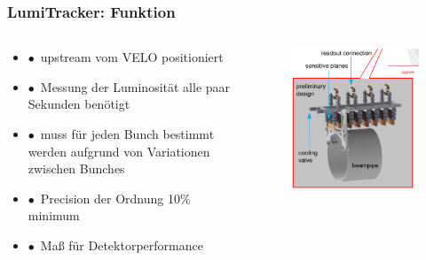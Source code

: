 \documentclass[aspectratio=1610, 12pt, xcolor=dvipsnames]{beamer}
\begin{document}
\begin{frame}\frametitle{LumiTracker: Funktion}
  \begin{columns}
    \begin{column}[c]{0.48\textwidth}
      \begin{itemize}
        \item $\bullet$\, upstream vom VELO positioniert
        \item $\bullet$\, Messung der Luminosität alle paar Sekunden benötigt
        \item $\bullet$\, muss für jeden Bunch bestimmt werden aufgrund von Variationen zwischen Bunches
        \item $\bullet$\, Precision der Ordnung 10\% minimum
        \item $\bullet$\, Maß für Detektorperformance
      \end{itemize}
    \end{column}
    \begin{column}[c]{0.48\textwidth}
      \begin{figure}
	       \centering
	       \includegraphics[width=\textwidth]{plots/lumi.png}
      \end{figure}
    \end{column}
  \end{columns}
\end{frame}
\end{document}
